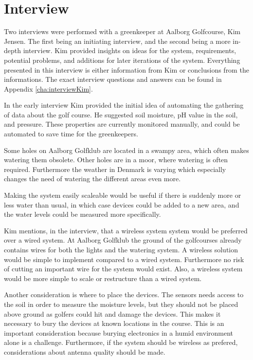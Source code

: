 \section{Interview}
Two interviews were performed with a greenkeeper at Aalborg Golfcourse, Kim Jensen. The first being an initiating interview, and the second being a more in-depth interview. Kim provided insights on ideas for the system, requirements, potential problems, and additions for later iterations of the system. Everything presented in this interview is either information from Kim or conclusions from the informations. The exact interview questions and answers can be found in Appendix \ref{cha:interviewKim}. 

In the early interview Kim provided the initial idea of automating the gathering of data about the golf course. He suggested soil moisture, pH value in the soil, and pressure. These properties are currently monitored manually, and could be automated to save time for the greenkeepers.

Some holes on Aalborg Golfklub are located in a swampy area, which often makes watering them obsolete. Other holes are in a moor, where watering is often required. Furthermore the weather in Denmark is varying which especially changes the need of watering the different areas even more. 

Making the system easily scaleable would be useful if there is suddenly more or less water than usual, in which case devices could be added to a new area, and the water levels could be measured more specifically.

Kim mentions, in the interview, that a wireless system system would be preferred over a wired system. At Aalborg Golfklub the ground of the golfcourses already contains wires for both the lights and the watering system. A wireless solution would be simple to implement compared to a wired system. Furthermore no risk of cutting an important wire for the system would exist. Also, a wireless system would be more simple to scale or restructure than a wired system.

Another consideration is where to place the devices. The sensors needs access to the soil in order to measure the moisture levels, but they should not be placed above ground as golfers could hit and damage the devices. This makes it necessary to bury the devices at known locations in the course. This is an important consideration because burying electronics in a humid environment alone is a challenge. Furthermore, if the system should be wireless as prefered, considerations about antenna quality should be made.

